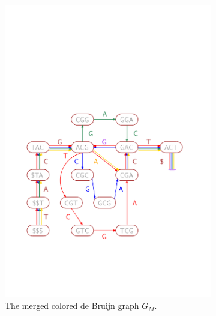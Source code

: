 \begin{figure}[h!t]
\begin{subfigure}[b]{0.45\textwidth}
\includegraphics[width=1.0\textwidth]{varimerge/browngraph.pdf}
\caption{The merged colored de Bruijn graph $G_M$.}
\end{subfigure}~\begin{subfigure}[b]{0.45\textwidth}


\end{subfigure}
\end{figure}
